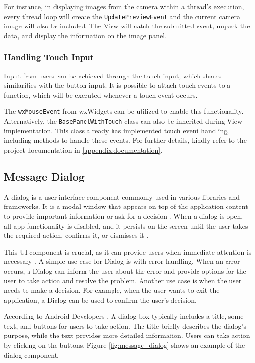 For instance, in displaying images from the camera within a thread's execution, every thread loop will create the \texttt{UpdatePreviewEvent} and the current camera image will also be included. The View will catch the submitted event, unpack the data, and display the information on the image panel.

\subsubsection{Handling Touch Input}
\label{subsubsec:handling_touch_input}
Input from users can be achieved through the touch input, which shares similarities with the button input. It is possible to attach touch events to a function, which will be executed whenever a touch event occurs.

The \texttt{wxMouseEvent} from wxWidgets can be utilized to enable this functionality. Alternatively, the \texttt{BasePanelWithTouch} class can also be inherited during View implementation. This class already has implemented touch event handling, including methods to handle these events. For further details, kindly refer to the project documentation in \ref{appendix:documentation}.

\subsection{Message Dialog}
\label{subsec:message_dialog}

A dialog is a user interface component commonly used in various libraries and frameworks. It is a modal window that appears on top of the application content to provide important information or ask for a decision \cite{Bay_2022}. When a dialog is open, all app functionality is disabled, and it persists on the screen until the user takes the required action, confirms it, or dismisses it \cite{Bay_2022}.

This UI component is crucial, as it can provide users when immediate attention is necessary \cite{MaterialUI}. A simple use case for Dialog is with error handling. When an error occurs, a Dialog can inform the user about the error and provide options for the user to take action and resolve the problem. Another use case is when the user needs to make a decision. For example, when the user wants to exit the application, a Dialog can be used to confirm the user's decision.

According to Android Developers \cite{Android_Developers}, A dialog box typically includes a title, some text, and buttons for users to take action. The title briefly describes the dialog's purpose, while the text provides more detailed information. Users can take action by clicking on the buttons. Figure \ref{fig:message_dialog} shows an example of the dialog component.

